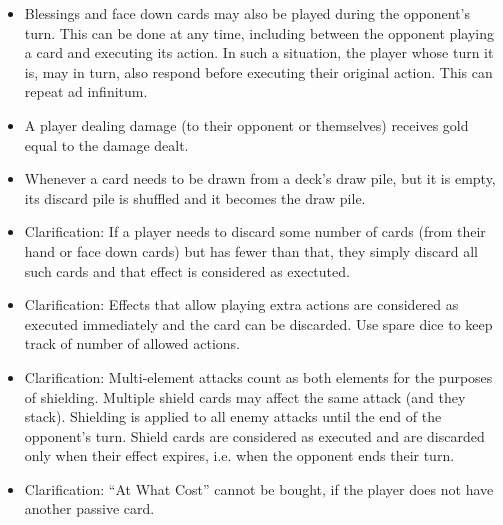 \documentclass[dvipsnames,parskip,a4paper]{scrartcl}
\begin{document}
\begin{itemize}
\item

Blessings and face down cards may also be played during the opponent's turn. This can be done at any time, including between the opponent playing a card and executing its action. In such a situation, the player whose turn it is, may in turn, also respond before executing their original action. This can repeat ad infinitum.

\item

A player dealing damage (to their opponent or themselves) receives gold equal to the damage dealt.

\item

Whenever a card needs to be drawn from a deck's draw pile, but it is empty, its discard pile is shuffled and it becomes the draw pile.

\item

Clarification: If a player needs to discard some number of cards (from their hand or face down cards) but has fewer than that, they simply discard all such cards and that effect is considered as exectuted.

\item

Clarification: Effects that allow playing extra actions are considered as executed immediately and the card can be discarded. Use spare dice to keep track of number of allowed actions.

\item

Clarification: Multi-element attacks count as both elements for the purposes of shielding. Multiple shield cards may affect the same attack (and they stack). Shielding is applied to all enemy attacks until the end of the opponent's turn. Shield cards are considered as executed and are discarded only when their effect expires, i.e. when the opponent ends their turn.

\item

Clarification: ``At What Cost'' cannot be bought, if the player does not have another passive card.

\end{itemize}

\newpage
\end{document}
